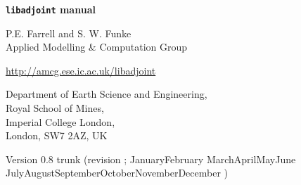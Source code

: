\documentclass[11pt,a4paper]{book}
\newcommand{\libadjoint}[0]{{\texttt{libadjoint}}\xspace}
\def\today{\number\day\space\ifcase\month\or
 January\or February \or March\or April\or May\or June\or
 July\or August\or September\or October\or November\or December\fi
 \space\number\year}
\begin{document}

\dominitoc[c]

\frontmatter

\begin{titlepage}

\begin{center}

\mbox{}

\vfill

{\bfseries{\huge
\libadjoint manual
\\}}

\vspace{40mm}

{\LARGE
P.E. Farrell and S. W. Funke\\
Applied Modelling \& Computation Group
\\}

\vspace{1mm}


{\LARGE
\url{http://amcg.ese.ic.ac.uk/libadjoint}
}

\vspace{10mm}

{\LARGE
Department of Earth Science and Engineering,\\
Royal School of Mines,\\
Imperial College London,\\
London, SW7 2AZ, UK
\\}

\vspace{80mm}


{\Large
Version 0.8 trunk (revision ; \today)
\\}

\vfill

\end{center}

\end{titlepage}



\renewcommand\l@section{\@dottedtocline{1}{1.5em}{2.7em}}
\renewcommand\l@subsection{\@dottedtocline{2}{4.2em}{3.6em}}
\renewcommand\l@subsubsection{\@dottedtocline{3}{7.8em}{4.5em}}
\renewcommand\mtctitle{\hfil\ Contents\hfil}

\makeatother

{ \setlength{\parskip}{0pt} \tableofcontents}
\end{document}
